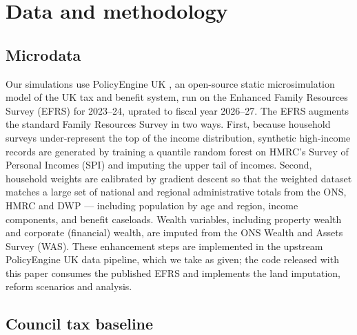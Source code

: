 \section{Data and methodology}
\label{sec:methodology}

\subsection{Microdata}

Our simulations use PolicyEngine UK \citep{policyengine}, an open-source static microsimulation model of the UK tax and benefit system, run on the Enhanced Family Resources Survey (EFRS) for 2023--24, uprated to fiscal year 2026--27. The EFRS augments the standard Family Resources Survey in two ways. First, because household surveys under-represent the top of the income distribution, synthetic high-income records are generated by training a quantile random forest on HMRC's Survey of Personal Incomes (SPI) and imputing the upper tail of incomes. Second, household weights are calibrated by gradient descent so that the weighted dataset matches a large set of national and regional administrative totals from the ONS, HMRC and DWP --- including population by age and region, income components, and benefit caseloads. Wealth variables, including property wealth and corporate (financial) wealth, are imputed from the ONS Wealth and Assets Survey (WAS). These enhancement steps are implemented in the upstream PolicyEngine UK data pipeline, which we take as given; the code released with this paper consumes the published EFRS and implements the land imputation, reform scenarios and analysis.

\subsection{Council tax baseline}

